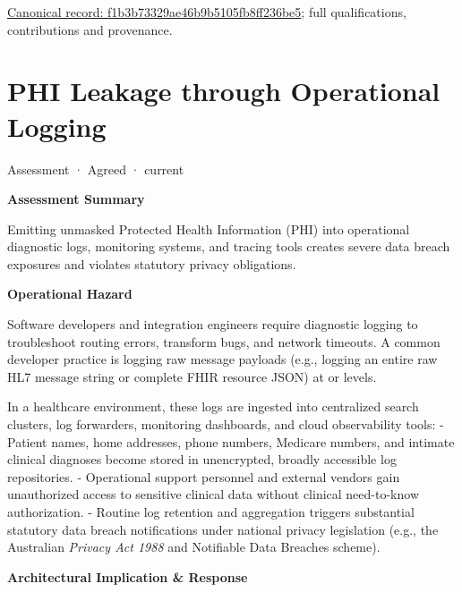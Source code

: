 {\footnotesize \href{../../../../continuum/motivation/assessment/f1b3b73329ae46b9b5105fb8ff236be5.md}{Canonical record: f1b3b73329ae46b9b5105fb8ff236be5}; full qualifications, contributions and provenance.}\par
\section{PHI Leakage through Operational Logging}

\label{element:6d8848b700df4f6eacc0347993ac541a}
{\small Assessment · Agreed · current}\par

\par\medskip\textbf{Assessment Summary}\par


Emitting unmasked Protected Health Information (PHI) into operational diagnostic logs, monitoring systems, and tracing tools creates severe data breach exposures and violates statutory privacy obligations.



\par\medskip\textbf{Operational Hazard}\par


Software developers and integration engineers require diagnostic logging to troubleshoot routing errors, transform bugs, and network timeouts. A common developer practice is logging raw message payloads (e.g., logging an entire raw HL7 message string or complete FHIR resource JSON) at \texttt{} or \texttt{} levels.



In a healthcare environment, these logs are ingested into centralized search clusters, log forwarders, monitoring dashboards, and cloud observability tools:
- Patient names, home addresses, phone numbers, Medicare numbers, and intimate clinical diagnoses become stored in unencrypted, broadly accessible log repositories.
- Operational support personnel and external vendors gain unauthorized access to sensitive clinical data without clinical need-to-know authorization.
- Routine log retention and aggregation triggers substantial statutory data breach notifications under national privacy legislation (e.g., the Australian \emph{Privacy Act 1988} and Notifiable Data Breaches scheme).



\par\medskip\textbf{Architectural Implication \& Response}\par


